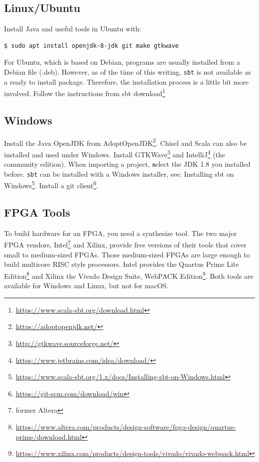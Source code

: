 \documentclass[%
    10pt,
    headinclude, footexclude,
    openright, %
    notitlepage,
    cleardoubleempty,
    headsepline,
    pointlessnumbers,
    bibtotoc, idxtotoc,
    ]{scrbook}
\newcommand{\code}[1]{{\small{\texttt{#1}}}}
\newcommand{\myref}[2]{\href{#1}{#2}}
\renewcommand{\myref}[2]{{#2}{\footnote{\url{#1}}}}
\begin{document}
\subsection{Linux/Ubuntu}

Install Java and useful tools in Ubuntu with:
\begin{verbatim}
$ sudo apt install openjdk-8-jdk git make gtkwave
\end{verbatim}

For Ubuntu, which is based on Debian, programs are usually installed from a
Debian file (.deb). However, as of the time of this writing, \code{sbt} is not
available as a ready to install package. Therefore, the installation process
is a little bit more involved.
Follow the instructions from \myref{https://www.scala-sbt.org/download.html}{sbt download}

\subsection{Windows}

Install the Java OpenJDK from \myref{https://adoptopenjdk.net/}{AdoptOpenJDK}.
Chisel and Scala can also be installed and used under Windows.
Install \myref{http://gtkwave.sourceforge.net/}{GTKWave} and
\myref{https://www.jetbrains.com/idea/download/}{IntelliJ} (the community edition).
When importing a project, {\textbf select the JDK 1.8} you installed before.
\code{sbt} can be installed with a Windows installer, see:
\myref{https://www.scala-sbt.org/1.x/docs/Installing-sbt-on-Windows.html}{Installing sbt on Windows}.
Install a \myref{https://git-scm.com/download/win}{git client}.

\subsection{FPGA Tools}

To build hardware for an FPGA, you need a synthesize tool. The two major
FPGA vendors, Intel\footnote{former Altera} and Xilinx, provide free versions of
their tools that cover small to medium-sized FPGAs. Those medium-sized
FPGAs are large enough to build multicore RISC style processors.
Intel provides the \myref{https://www.altera.com/products/design-software/fpga-design/quartus-prime/download.html}{Quartus Prime Lite Edition} and Xilinx the
\myref{https://www.xilinx.com/products/design-tools/vivado/vivado-webpack.html}{Vivado Design Suite, WebPACK Edition}.
Both tools are available for Windows and Linux, but not for macOS.
\end{document}
